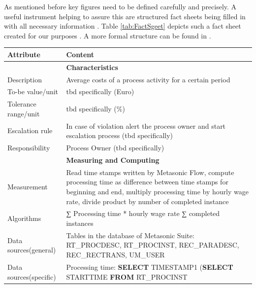As mentioned before key figures need to be defined carefully and precisely. A useful instrument helping to assure this are structured fact sheets being filled in with all necessary information \cite{book:KennzahlenIT}. Table \ref{tab:FactSgeet} depicts such a fact sheet created for our purposes \cite{book:MonitoringSubjekt}. A more formal structure can be found in \cite{article:ProcessPerfInd}.



\begin{table}[htbp]
	\centering
	\begin{tabular}{|p{3.0 cm } |p{10.0 cm }|}
		\hline
		\textbf{Attribute} & \textbf{Content}\\
		\hline
		\hline
		& \textbf{Characteristics}\\
		\hline
		Description & Average costs of a process activity for a certain period\\
		\hline
		To-be value/unit & tbd specifically (Euro)\\
		\hline
		Tolerance range/unit & tbd specifically (\%)\\
		\hline
		Escalation rule & In case of violation alert the process owner and start escalation process (tbd specifically)\\
		\hline
		Responsibility & Process Owner (tbd specifically)\\
		\hline
		\hline
		& \textbf{Measuring and Computing}\\
		\hline
		Measurement & Read time stamps written by Metasonic Flow, compute processing time as difference between time stamps for beginning and end, multiply processing time by hourly wage rate, divide product by number of completed instance\\
		\hline
		Algorithms & ∑ Processing time * hourly wage rate
					∑ completed instances\\
		\hline
		Data sources(general) & Tables in the database of Metasonic Suite:\newline
		RT\_PROCDESC, RT\_PROCINST, REC\_PARADESC, REC\_RECTRANS, UM\_USER\\
		\hline
		Data sources(specific) & Processing time:\newline
		\hspace*{4mm} \textbf{SELECT} TIMESTAMP1 \newline
		\hspace*{10mm} (\textbf{SELECT} STARTTIME \newline
		\hspace*{10mm} \textbf{FROM} RT\_PROCINST \newline

\end{tabular}
\end{table}
